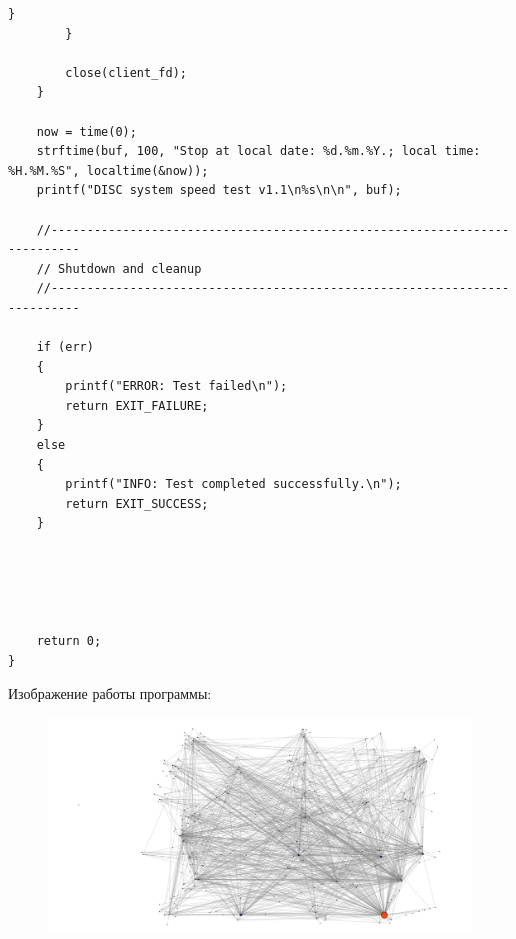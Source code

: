 \begin{lstlisting}[label=code, caption=Код чтения из файла]
			}
		}
		
		close(client_fd);
	}
	
	now = time(0);
	strftime(buf, 100, "Stop at local date: %d.%m.%Y.; local time: %H.%M.%S", localtime(&now));
	printf("DISC system speed test v1.1\n%s\n\n", buf);
	
	//--------------------------------------------------------------------------
	// Shutdown and cleanup
	//--------------------------------------------------------------------------
	
	if (err)
	{
		printf("ERROR: Test failed\n");
		return EXIT_FAILURE;
	}
	else
	{
		printf("INFO: Test completed successfully.\n");
		return EXIT_SUCCESS;
	}
	
	
	
	
	
	return 0;
}

\end{lstlisting}

Изображение работы программы:

\begin{figure}[h!]
	\begin{center}
		\includegraphics[scale=0.6]{assets/jopa.jpg}
	\end{center}
\end{figure}